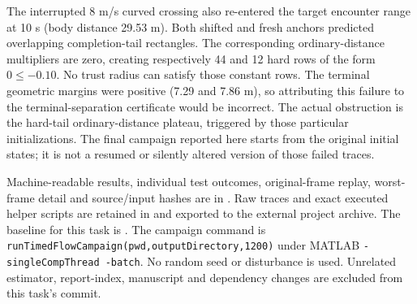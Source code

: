 \documentclass[11pt]{article}
\begin{document}
The interrupted 8 m/s curved crossing also re-entered the target encounter
range at 10 s (body distance 29.53 m). Both shifted and fresh anchors predicted overlapping completion-tail
rectangles. The corresponding ordinary-distance multipliers are zero,
creating respectively 44 and 12 hard rows of the form $0\le-0.10$.
No trust radius can satisfy those constant rows. The terminal geometric
margins were positive (7.29 and 7.86 m), so attributing this failure to the
terminal-separation certificate would be incorrect. The actual obstruction
is the hard-tail ordinary-distance plateau, triggered by those particular
initializations. The final campaign
reported here starts from the original initial states; it is not a resumed or
silently altered version of those failed traces.

Machine-readable results, individual test outcomes, original-frame replay,
worst-frame detail and source/input hashes are in
.
Raw traces and exact executed helper scripts are retained in
and exported to the external project archive. The baseline for this task is
.
The campaign command is \texttt{runTimedFlowCampaign(pwd,outputDirectory,1200)}
under MATLAB \texttt{-singleCompThread -batch}. No random seed or disturbance
is used. Unrelated estimator, report-index, manuscript and dependency changes
are excluded from this task's commit.
\end{document}
